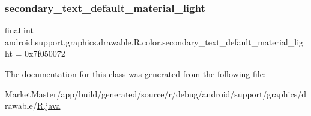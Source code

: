 \mbox{\label{classandroid_1_1support_1_1graphics_1_1drawable_1_1R_1_1color_a80596cd1d42bebf6c55a976d7ab49ee2}} 
\subsubsection{\texorpdfstring{secondary\+\_\+text\+\_\+default\+\_\+material\+\_\+light}{secondary\_text\_default\_material\_light}}
{\footnotesize\ttfamily final int android.\+support.\+graphics.\+drawable.\+R.\+color.\+secondary\+\_\+text\+\_\+default\+\_\+material\+\_\+light = 0x7f050072\hspace{0.3cm}{\ttfamily [static]}}



The documentation for this class was generated from the following file\+:\begin{DoxyCompactItemize}
\item 
Market\+Master/app/build/generated/source/r/debug/android/support/graphics/drawable/\mbox{\hyperlink{debug_2android_2support_2graphics_2drawable_2R_8java}{R.\+java}}\end{DoxyCompactItemize}
